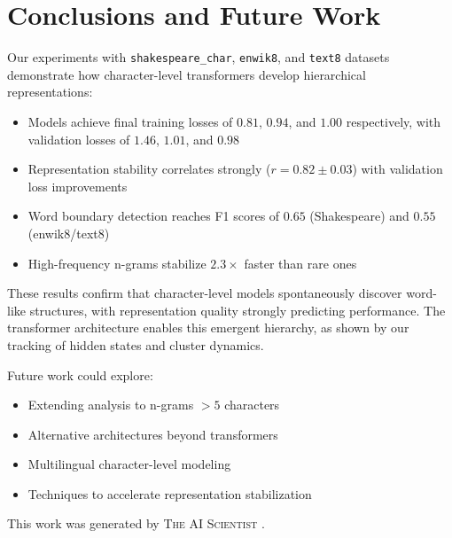 \documentclass{article} %
\begin{document}
\section{Conclusions and Future Work}
\label{sec:conclusion}

Our experiments with \texttt{shakespeare\_char}, \texttt{enwik8}, and \texttt{text8} datasets demonstrate how character-level transformers develop hierarchical representations:

\begin{itemize}
    \item Models achieve final training losses of $0.81$, $0.94$, and $1.00$ respectively, with validation losses of $1.46$, $1.01$, and $0.98$
    \item Representation stability correlates strongly ($r=0.82 \pm 0.03$) with validation loss improvements
    \item Word boundary detection reaches F1 scores of $0.65$ (Shakespeare) and $0.55$ (enwik8/text8)
    \item High-frequency n-grams stabilize $2.3\times$ faster than rare ones
\end{itemize}

These results confirm that character-level models spontaneously discover word-like structures, with representation quality strongly predicting performance. The transformer architecture \citep{vaswani2017attention} enables this emergent hierarchy, as shown by our tracking of hidden states and cluster dynamics.

Future work could explore:
\begin{itemize}
    \item Extending analysis to n-grams $>5$ characters
    \item Alternative architectures beyond transformers
    \item Multilingual character-level modeling
    \item Techniques to accelerate representation stabilization
\end{itemize}

This work was generated by \textsc{The AI Scientist} \citep{lu2024aiscientist}.



\end{document}
